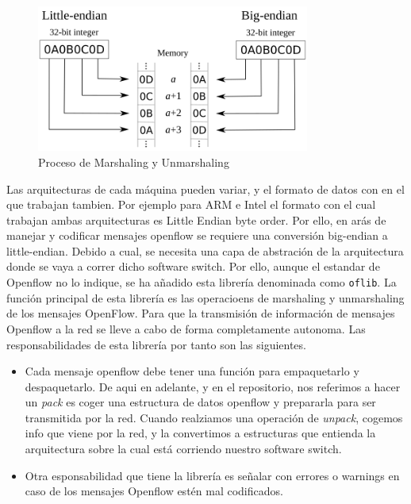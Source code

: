 \begin{figure}[ht]
    \centering
    \includegraphics[width=0.8\textwidth]{archivos/img/teoria/bofuss6.png}
    \caption{Proceso de Marshaling y Unmarshaling }
    \label{fig:bofuss6}
\end{figure}

Las arquitecturas de cada máquina pueden variar, y el formato de datos con en el que trabajan tambien. Por ejemplo para ARM e Intel el formato con el cual trabajan ambas arquitecturas es Little Endian byte order. Por ello, en arás de manejar y codificar mensajes openflow se requiere una conversión big-endian a little-endian. Debido a cual, se necesita una capa de abstración de la arquitectura donde se vaya a correr dicho software switch. Por ello, aunque el estandar de Openflow no lo indique, se ha añadido esta librería denominada como \texttt{oflib}. La función principal de esta librería es las operacioens de  marshaling y unmarshaling de los mensajes OpenFlow. Para que la transmisión de información de mensajes Openflow a la red se lleve a cabo de forma completamente autonoma. Las responsabilidades de esta librería por tanto son las siguientes.

\begin{itemize}
    \item Cada mensaje openflow debe tener una función para empaquetarlo y despaquetarlo. De aqui en adelante, y en el repositorio, nos referimos a hacer un \textit{pack} es coger una estructura de datos openflow y prepararla para ser transmitida por la red. Cuando realziamos una operación de \textit{unpack}, cogemos info que viene por la red, y la convertimos a estructuras que entienda la arquitectura sobre la cual está corriendo nuestro software switch.
    \item Otra esponsabilidad que tiene la librería es señalar con errores o warnings en caso de los mensajes Openflow estén mal codificados.
\end{itemize}


